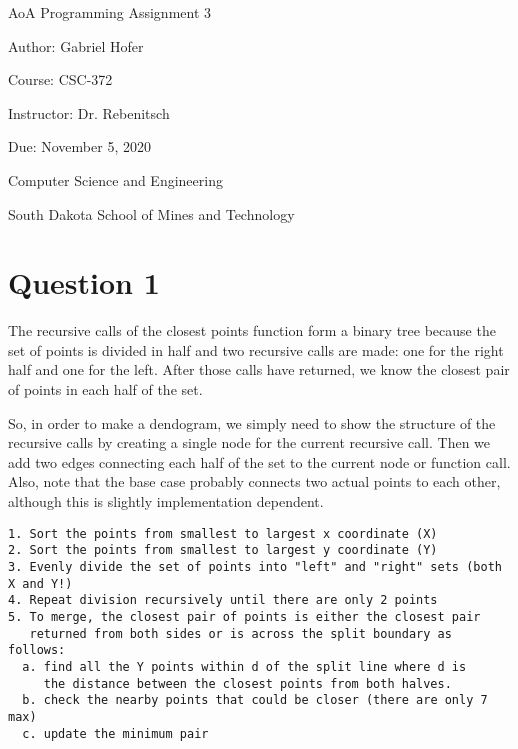 \documentclass[12pt]{article}
\begin{document}
\begin{titlepage}
   \begin{center}
       \vspace*{1cm}
       \Large
       AoA Programming Assignment 3
       \normalsize

       \vspace{0.5cm}

       Author: Gabriel Hofer

       \vspace{0.5cm}

       Course: CSC-372

       \vspace{0.5cm}

       Instructor: Dr. Rebenitsch
       \vspace{0.5cm}

       Due: November 5, 2020

       \vfill

       Computer Science and Engineering\

       South Dakota School of Mines and Technology\
   \end{center}
\end{titlepage}
\newpage
\small
\section*{Question 1}
\indent 
\par
The recursive calls of the closest points function form a binary tree because the set of points is 
divided in half and two recursive calls are made: one for the right half and one for the left. 
After those calls have returned, we know the closest pair of points in each half of the set. 

So, in order to make a dendogram, we simply need to show the structure of the recursive calls by 
creating a single node for the current recursive call. Then we add two edges connecting each half 
of the set to the current node or function call. Also, note that the base case probably connects two
actual points to each other, although this is slightly implementation dependent.

\begin{verbatim}
1. Sort the points from smallest to largest x coordinate (X)
2. Sort the points from smallest to largest y coordinate (Y)
3. Evenly divide the set of points into "left" and "right" sets (both X and Y!)
4. Repeat division recursively until there are only 2 points
5. To merge, the closest pair of points is either the closest pair 
   returned from both sides or is across the split boundary as follows:
  a. find all the Y points within d of the split line where d is 
     the distance between the closest points from both halves.
  b. check the nearby points that could be closer (there are only 7 max)
  c. update the minimum pair 
\end{verbatim}
\end{document}
